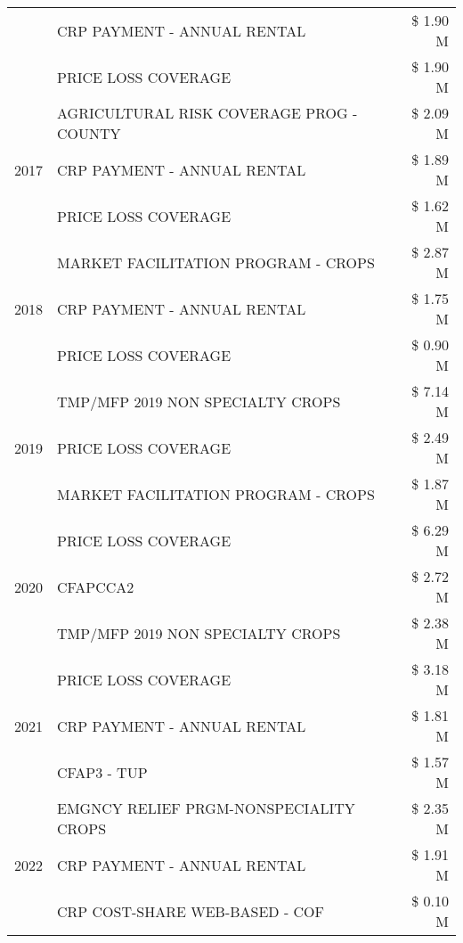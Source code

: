 \begin{tabular}{llr}
 & CRP PAYMENT - ANNUAL RENTAL & \$ 1.90 M \\
 & PRICE LOSS COVERAGE & \$ 1.90 M \\
\cline{1-3}
\multirow[t]{3}{*}{2017} & AGRICULTURAL RISK COVERAGE PROG - COUNTY & \$ 2.09 M \\
 & CRP PAYMENT - ANNUAL RENTAL & \$ 1.89 M \\
 & PRICE LOSS COVERAGE & \$ 1.62 M \\
\cline{1-3}
\multirow[t]{3}{*}{2018} & MARKET FACILITATION PROGRAM - CROPS & \$ 2.87 M \\
 & CRP PAYMENT - ANNUAL RENTAL & \$ 1.75 M \\
 & PRICE LOSS COVERAGE & \$ 0.90 M \\
\cline{1-3}
\multirow[t]{3}{*}{2019} & TMP/MFP 2019 NON SPECIALTY CROPS & \$ 7.14 M \\
 & PRICE LOSS COVERAGE & \$ 2.49 M \\
 & MARKET FACILITATION PROGRAM - CROPS & \$ 1.87 M \\
\cline{1-3}
\multirow[t]{3}{*}{2020} & PRICE LOSS COVERAGE & \$ 6.29 M \\
 & CFAPCCA2 & \$ 2.72 M \\
 & TMP/MFP 2019 NON SPECIALTY CROPS & \$ 2.38 M \\
\cline{1-3}
\multirow[t]{3}{*}{2021} & PRICE LOSS COVERAGE & \$ 3.18 M \\
 & CRP PAYMENT - ANNUAL RENTAL & \$ 1.81 M \\
 & CFAP3 - TUP & \$ 1.57 M \\
\cline{1-3}
\multirow[t]{3}{*}{2022} & EMGNCY RELIEF PRGM-NONSPECIALITY CROPS & \$ 2.35 M \\
 & CRP PAYMENT - ANNUAL RENTAL & \$ 1.91 M \\
 & CRP COST-SHARE WEB-BASED - COF & \$ 0.10 M \\
\cline{1-3}
\bottomrule
\end{tabular}
